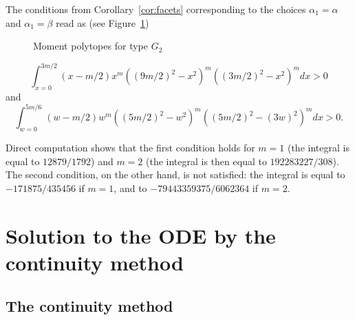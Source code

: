 \documentclass[JEP,XML,SOM,Unicode, NoEqCountersInSection, NoFloatCountersInSection]{cedram}
\theoremstyle{plain}
\theoremstyle{definition}
\begin{document}
The conditions from Corollary~\ref{cor:facets} corresponding to the choices
$\alpha_1=\alpha$ and $\alpha_1=\beta$ read as (see Figure~\ref{fig:G2pol})
\begin{figure}
\smaller\centering
{}
\caption{Moment polytopes for type $G_2$}
\label{fig:G2pol}
\end{figure}
\begin{equation*}
\int_{x=0}^{3m/2}
(x-m/2)
x^m((9m/2)^2-x^2)^m((3m/2)^2-x^2)^m
dx
>0
\end{equation*}
and
\begin{equation*}
\int_{w=0}^{5m/6}
(w-m/2)
w^m((5m/2)^2-w^2)^m((5m/2)^2-(3w)^2)^m
dx
>0.
\end{equation*}

Direct computation shows that the first condition holds
for $m=1$ (the integral is equal to $12879/1792$)
and $m=2$ (the integral is then equal to $192283227/308$).
The second condition, on the other hand, is not satisfied:
the integral is equal to $-171875/435456$ if $m=1$, and
to $-79443359375/6062364$ if $m=2$.

\section{Solution to the ODE by the continuity method}
\label{sec:solut-ODE}

\subsection{The continuity method}
\end{document}
